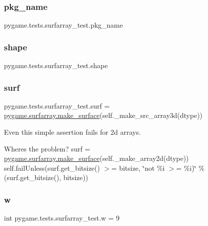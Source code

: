 \subsubsection{\texorpdfstring{pkg\+\_\+name}{pkg\_name}}
{\footnotesize\ttfamily pygame.\+tests.\+surfarray\+\_\+test.\+pkg\+\_\+name}

\mbox{\label{namespacepygame_1_1tests_1_1surfarray__test_a7c80667ec8c6297f43388370fdf508e1}} 
\subsubsection{\texorpdfstring{shape}{shape}}
{\footnotesize\ttfamily pygame.\+tests.\+surfarray\+\_\+test.\+shape}

\mbox{\label{namespacepygame_1_1tests_1_1surfarray__test_a9691668f5ffc1d3c0b6b68a135061f36}} 
\subsubsection{\texorpdfstring{surf}{surf}}
{\footnotesize\ttfamily pygame.\+tests.\+surfarray\+\_\+test.\+surf = \hyperlink{namespacepygame_1_1surfarray_a2e4d5099d42534776fd74076d289b250}{pygame.\+surfarray.\+make\+\_\+surface}(self.\+\_\+make\+\_\+src\+\_\+array3d(dtype))}



Even this simple assertion fails for 2d arrays. 

Where\textquotesingle{}s the problem? surf = \hyperlink{namespacepygame_1_1surfarray_a2e4d5099d42534776fd74076d289b250}{pygame.\+surfarray.\+make\+\_\+surface}(self.\+\_\+make\+\_\+array2d(dtype)) self.\+fail\+Unless(surf.\+get\+\_\+bitsize() $>$= bitsize, \char`\"{}not \%i $>$= \%i)\char`\"{} \% (surf.\+get\+\_\+bitsize(), bitsize)) \mbox{\label{namespacepygame_1_1tests_1_1surfarray__test_af3c71573efea667ee8e3ddc53cb48217}} 
\subsubsection{\texorpdfstring{w}{w}}
{\footnotesize\ttfamily int pygame.\+tests.\+surfarray\+\_\+test.\+w = 9}

